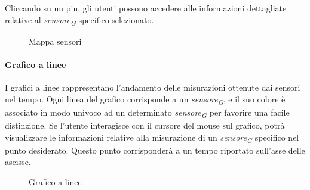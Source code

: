 Cliccando su un pin, gli utenti possono accedere alle informazioni dettagliate relative al \textit{sensore}\textsubscript{\textit{G}} specifico selezionato.
\begin{figure}[H]
    \centering
    \caption{Mappa sensori}
    \label{fig:my_label}
\end{figure}


\paragraph{Grafico a linee}
\hypertarget{par:grafico_linee}{}
I grafici a linee rappresentano l'andamento delle misurazioni ottenute dai sensori nel tempo. Ogni linea del grafico corrisponde a un \textit{sensore}\textsubscript{\textit{G}}, e il suo colore è associato in modo univoco ad un determinato \textit{sensore}\textsubscript{\textit{G}} per favorire una facile distinzione. Se l'utente interagisce con il cursore del mouse sul grafico, potrà visualizzare le informazioni relative alla misurazione di un \textit{sensore}\textsubscript{\textit{G}} specifico nel punto desiderato. Questo punto corrisponderà a un tempo riportato sull'asse delle ascisse.  
\begin{figure}[H]
    \centering
    \caption{Grafico a linee}
    \label{fig:my_label}
\end{figure}


